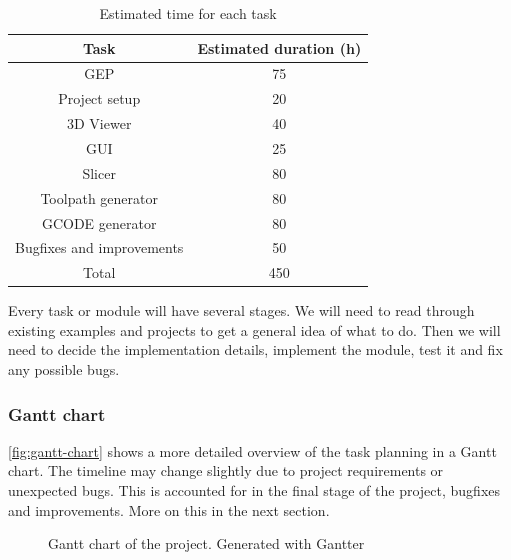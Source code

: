 \FloatBarrier
\begin{table}[h!]
\centering
\begin{tabular}{ |c|c| } 
    \hline
    Task & Estimated duration (h)  \\ 
    \hline
    
    \hline
    GEP & 75  \\ 
    \hline
    Project setup & 20  \\ 
    \hline
    3D Viewer & 40  \\ 
    \hline
    GUI & 25  \\ 
    \hline
    Slicer & 80  \\ 
    \hline
    Toolpath generator & 80  \\ 
    \hline
    GCODE generator & 80  \\ 
    \hline
    Bugfixes and improvements & 50 \\
    
    \hline
    Total & 450 \\
    \hline
\end{tabular}
\caption{Estimated time for each task}\label{table:task-time}
\end{table}
\FloatBarrier


Every task or module will have several stages. We will need to read through existing examples and projects to get a general idea of what to do. Then we will need to decide the implementation details, implement the module, test it and fix any possible bugs.

\subsubsection{Gantt chart}

\autoref{fig:gantt-chart} shows a more detailed overview of the task planning in a Gantt chart. The timeline may change slightly due to project requirements or unexpected bugs. This is accounted for in the final stage of the project, bugfixes and improvements. More on this in the next section.


\begin{figure}[H]
    \noindent{}
    \caption{Gantt chart of the project. Generated with Gantter \cite{gantter}}
    \label{fig:gantt-chart}
\end{figure}



